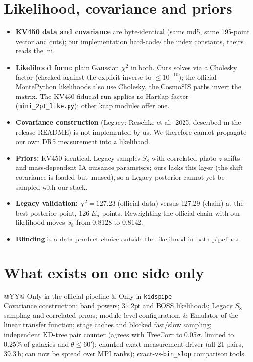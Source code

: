 \documentclass[10pt,a4paper]{article}
\newcommand{\file}[1]{{\small\texttt{#1}}}
\begin{document}
\section{Likelihood, covariance and priors}
\begin{itemize}
\item \textbf{KV450 data and covariance} are byte-identical (same md5, same 195-point vector and cuts); our implementation hard-codes the index constants, theirs reads the ini.
\item \textbf{Likelihood form:} plain Gaussian $\chi^2$ in both. Ours solves via a Cholesky factor (checked against the explicit inverse to $\le10^{-10}$); the official MontePython likelihoods also use Cholesky, the CosmoSIS paths invert the matrix. The KV450 fiducial run applies no Hartlap factor (\file{mini\_2pt\_like.py}); other kcap modules offer one.
\item \textbf{Covariance construction} (Legacy: Reischke et al.\ 2025, described in the release README) is not implemented by us. We therefore cannot propagate our own DR5 measurement into a likelihood.
\item \textbf{Priors:} KV450 identical. Legacy samples $S_8$ with correlated photo-$z$ shifts and mass-dependent IA nuisance parameters; ours lacks this layer (the shift covariance is loaded but unused), so a Legacy posterior cannot yet be sampled with our stack.
\item \textbf{Legacy validation:} $\chi^2=127.23$ (official data) versus 127.29 (chain) at the best-posterior point, 126 $E_n$ points. Reweighting the official chain with our likelihood moves $S_8$ from 0.8128 to 0.8142.
\item \textbf{Blinding} is a data-product choice outside the likelihood in both pipelines.
\end{itemize}

\section{What exists on one side only}
\begin{tabularx}{\textwidth}{@{}YY@{}}
\toprule
Only in the official pipeline & Only in \texttt{kidspipe} \\
\midrule
Covariance construction; band powers; 3$\times$2pt and BOSS likelihoods; Legacy $S_8$ sampling and correlated priors; module-level configuration. & Emulator of the linear transfer function; stage caches and blocked fast/slow sampling; independent KD-tree pair counter (agrees with TreeCorr to 0.05$\sigma$, limited to 0.25\% of galaxies and $\theta\le60'$); chunked exact-measurement driver (all 21 pairs, 39.3\,h; can now be spread over MPI ranks); exact-vs-\texttt{bin\_slop} comparison tools. \\
\bottomrule
\end{tabularx}
\end{document}

